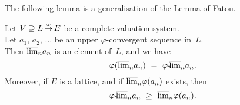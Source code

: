 \documentclass[main.tex]{subfiles}
\begin{document}
%
%
\noindent The following lemma
is a generalisation of the Lemma of Fatou.
\begin{lem}
\label{L:fatou}
Let $V \supseteq L\,\smash{\stackrel{\varphi}{\rightarrow}}\,E$ be a complete
valuation system.\\
Let $a_1,\,a_2,\,\dotsc$ be an upper $\varphi$-convergent
sequence in~$L$. \\
Then $\smash{\overline{\lim}_{n}} a_n$
is an element of~$L$, and we have
\begin{equation*}
\varphi(\ulim{n}a_n) \ =\ 
\pulim\varphi{n} a_n.
\end{equation*}
Moreover,
if $E$ is a lattice, and
if $\smash{\overline{\lim}_{n}}\varphi(a_n)$ exists, then
\begin{equation*}
{\varphi}\text{-}\!\smash{\overline{\lim}_{n}}a_n
\ \geq\  
\smash{\overline{\lim}_{n}}\varphi(a_n) .
\end{equation*}
\end{lem}
\end{document}
